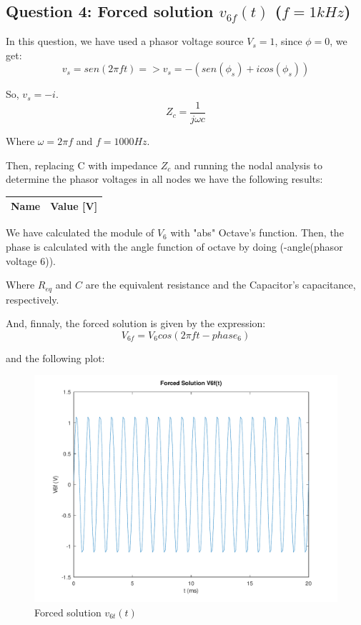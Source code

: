 \subsection{Question 4: Forced solution $v_{6f}(t)$ ($f=1kHz$)}
In this question, we have used a phasor voltage source $V_s = 1$, since $\phi = 0$, we get:
\begin{equation}
     v_s = sen(2\pi ft) => v_s = -(sen(\phi_s) + icos(\phi_s))
\end{equation}\par
So, $v_s=-i$.
\begin{equation}
     Z_c = \frac{1}{j\omega c}
\end{equation}\par
Where $\omega= 2\pi f$ and $f= 1000Hz$.\par

Then, replacing C with  impedance $Z_c$ and running the nodal analysis to determine the phasor voltages in all nodes we have the following results:\par

\begin{center}
  \begin{tabular}{ | c | c | }
    \hline    
    {\bf Name} & {\bf Value [V]} \\ \hline
    
    \hline
  \end{tabular}
\end{center}

We have calculated the module of $V_6$ with "abs" Octave's function. Then, the phase is calculated with the angle function of octave by doing (-angle(phasor voltage 6)). \par

Where $R_{eq}$ and $C$ are the equivalent resistance and the Capacitor's capacitance, respectively.

And, finnaly, the forced solution is given by the expression:
\begin{equation}
     V_{6f}= V_6cos({2\pi f}{t} - phase_6)
\end{equation}\par
and the following plot:\par

\begin{figure}[H] \centering
\includegraphics[width=0.7\linewidth]{../mat/alinea4.pdf}
\caption{Forced solution $v_{6t}(t)$}
\label{fig:plot4}
\end{figure}

